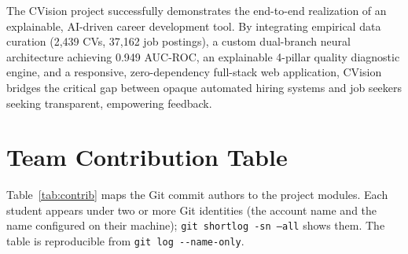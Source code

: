 \documentclass[11pt,a4paper]{article}
\begin{document}
The CVision project successfully demonstrates the end-to-end realization of an
explainable, AI-driven career development tool. By integrating empirical data
curation (2,439 CVs, 37,162 job postings), a custom dual-branch neural architecture
achieving 0.949 AUC-ROC, an explainable 4-pillar quality diagnostic engine, and a
responsive, zero-dependency full-stack web application, CVision bridges the critical
gap between opaque automated hiring systems and job seekers seeking transparent,
empowering feedback.



\section{Team Contribution Table}
Table~\ref{tab:contrib} maps the Git commit authors to the project modules.
Each student appears under two or more Git identities (the account name and the
name configured on their machine); \texttt{git shortlog -sn --all} shows them.
The table is reproducible from \texttt{git log -{}-name-only}.
\end{document}
